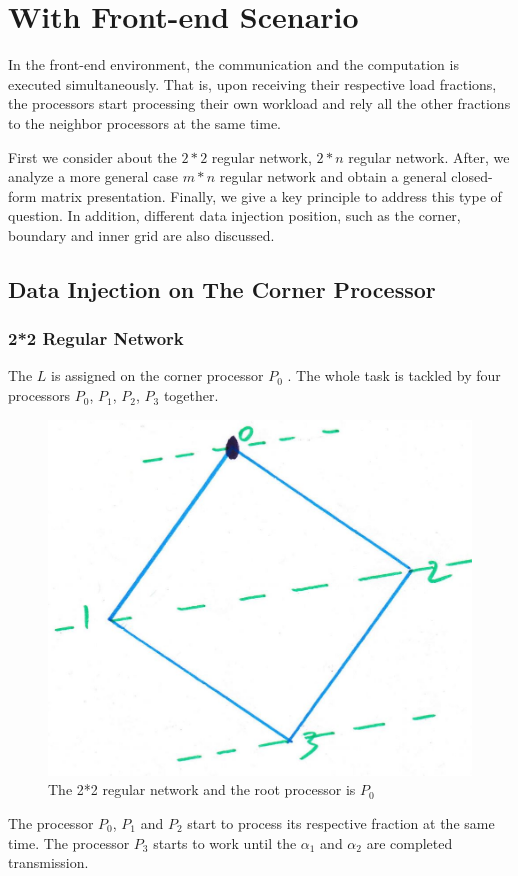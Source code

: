 \section{With Front-end Scenario}
In the front-end environment, the communication and the computation is executed simultaneously.  That is, upon receiving their respective load fractions,  the processors start processing their own workload and rely all the other fractions to the neighbor processors at the same time.  

First we consider about the $2*2$ regular network,  $2*n$ regular network.  After, we analyze a more general case $m*n$ regular network and obtain a general closed-form matrix presentation.  Finally, we give a key principle to address this type of question.  In addition, different data injection position, such as the corner, boundary and inner grid are also discussed.  

\subsection{Data Injection on The Corner Processor}
\subsubsection{2*2 Regular Network}
The $L$ is assigned on the corner processor $P_{0}$ .  The whole task is tackled by four processors $P_{0}$, $P_{1}$, $P_{2}$, $P_{3}$ together.  

\begin{figure}[!ht]
\centering
\includegraphics[width=0.5\columnwidth]{figure/2t2.JPG}
\caption{The 2*2 regular network and the root processor is $P_{0}$}
\label{fig:2t2}
\end{figure}

The processor $P_{0}$, $P_{1}$ and $P_{2}$ start to process its respective fraction at the same time.  The processor $P_{3}$ starts to work until the $\alpha_{1}$ and $\alpha_{2}$ are completed transmission.  

